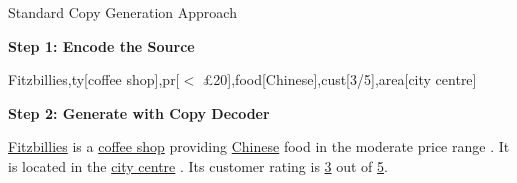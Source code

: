 \begin{frame}{Standard Copy Generation Approach}

\textbf{Step 1: Encode the Source}
\air

\begin{small}
Fitzbillies,ty[coffee shop],pr[$<$ \pounds 20],food[Chinese],cust[3/5],area[city centre]
\end{small}

\vspace{0.3cm}

\textbf{Step 2: Generate with Copy Decoder}

\air

\underline{Fitzbillies}  is a  \underline{coffee shop}  providing  \underline{Chinese} food in the  moderate  price range  .  It is  located in the  \underline{city centre}  .  Its customer rating is  \underline{3} out of \underline{5}.

\end{frame}



